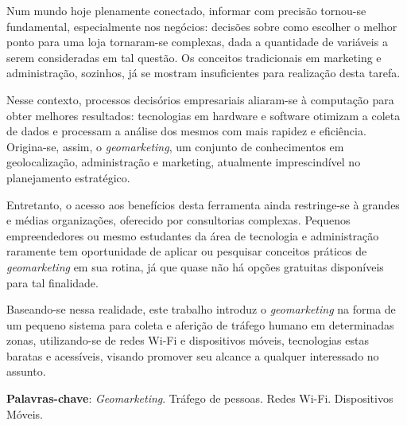 \documentclass[
		12pt,				%
		openright,			%
		oneside,			%
		a4paper,			%
		chapter=TITLE,		%
		english,			%
		brazil				%
	]{abntex2}
\newif\ifresumo
\begin{document}
\ifresumo
	\setlength{\absparsep}{18pt} %
	\begin{resumo}
			Num mundo hoje plenamente conectado, informar com precisão tornou-se fundamental, especialmente nos negócios: decisões sobre como escolher o melhor ponto para uma loja tornaram-se complexas, dada a quantidade de variáveis a serem consideradas em tal questão. Os conceitos tradicionais em marketing e administração, sozinhos, já se mostram insuficientes para realização desta tarefa. 
			
			Nesse contexto, processos decisórios empresariais aliaram-se à computação para obter melhores resultados: tecnologias em hardware e software otimizam a coleta de dados e processam a análise dos mesmos com mais rapidez e eficiência. Origina-se, assim, o \emph{geomarketing}, um conjunto de conhecimentos em geolocalização, administração e marketing, atualmente imprescindível no planejamento estratégico. 
			
			Entretanto, o acesso aos benefícios desta ferramenta ainda restringe-se à grandes e médias organizações, oferecido por consultorias complexas. Pequenos empreendedores ou mesmo estudantes da área de tecnologia e administração raramente tem oportunidade de aplicar ou pesquisar conceitos práticos de \emph{geomarketing} em sua rotina, já que quase não há opções gratuitas disponíveis para tal finalidade. 
			
			Baseando-se nessa realidade, este trabalho introduz o \emph{geomarketing} na forma de um pequeno sistema para coleta e aferição de tráfego humano em determinadas zonas, utilizando-se de redes Wi-Fi e dispositivos móveis, tecnologias estas baratas e acessíveis, visando promover seu alcance a qualquer interessado no assunto.

		\textbf{Palavras-chave}: \emph{Geomarketing}. Tráfego de pessoas. Redes Wi-Fi. Dispositivos Móveis.

	\end{resumo}
\end{document}
